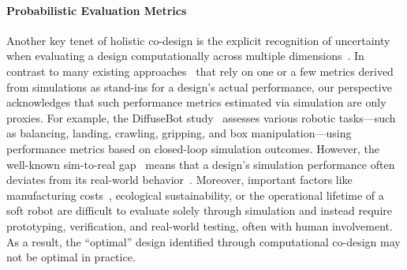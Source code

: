 \begin{figure}[h!]
{        %
    }
    \label{fig:apx:holisticcodesign:computational_co_design}
\end{figure}

\paragraph{Probabilistic Evaluation Metrics}
Another key tenet of holistic co-design is the explicit recognition of uncertainty when evaluating a design computationally across multiple dimensions~\citep{chen2020design}. In contrast to many existing approaches~\citep{wang2024diffusebot} that rely on one or a few metrics derived from simulations as stand-ins for a design’s actual performance, our perspective acknowledges that such performance metrics estimated via simulation are only proxies. For example, the DiffuseBot study~\citep{wang2024diffusebot} assesses various robotic tasks—such as balancing, landing, crawling, gripping, and box manipulation—using performance metrics based on closed-loop simulation outcomes. However, the well-known sim-to-real gap~\citep{dubied2022sim} means that a design’s simulation performance often deviates from its real-world behavior~\citep{junge2022leveraging}. Moreover, important factors like manufacturing costs~\citep{junge2022leveraging}, ecological sustainability, or the operational lifetime of a soft robot are difficult to evaluate solely through simulation and instead require prototyping, verification, and real-world testing, often with human involvement. As a result, the “optimal” design identified through computational co-design may not be optimal in practice.

